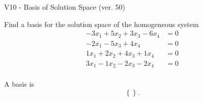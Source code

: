 \begin{exercise}
  \begin{exerciseTitle}V10 - Basis of Solution Space (ver. 50)\end{exerciseTitle}
  \begin{exerciseStatement}
    Find a basis for the solution space of the homogeneous system 
\begin{align*}
 -3 x_ 1 + 5 x_ 2 + 3 x_ 3 -6 x_ 4 &= 0  \\ 
  -2 x_ 1 -5 x_ 3 + 4 x_ 4 &= 0  \\ 
  1 x_ 1 + 2 x_ 2 + 4 x_ 3 + 1 x_ 4 &= 0  \\ 
  3 x_ 1 -1 x_ 2 -2 x_ 3 -2 x_ 4 &= 0  \\ 
 \end{align*}


 
  \end{exerciseStatement}

  \begin{exerciseAnswer}
   A basis is   
\[\left\{\right\}.\]

  


  \end{exerciseAnswer}
\end{exercise}